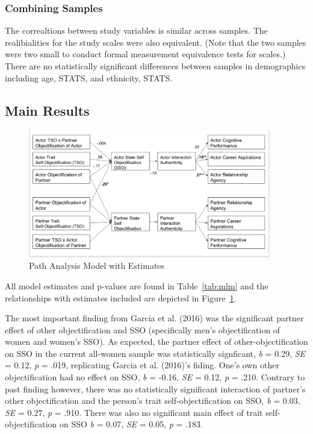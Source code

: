 \documentclass[man]{apa6}
\begin{document}
\subsubsection{Combining Samples}\label{combining-samples}

The correaltions between study variables is similar across samples. The
realibialities for the study scales were also equivalent. (Note that the
two samples were two small to conduct formal measurement equivalence
tests for scales.) There are no statistically significant differences
between samples in demographics including age, STATS, and ethnicity,
STATS.

\subsection{Main Results}\label{main-results}

\begin{figure}
\includegraphics[width=400px]{SEMfigure} \caption{Path Analysis Model with Estimates}\label{fig:semfigure}
\end{figure}

All model estimates and p-values are found in Table~\ref{tab:mlm} and
the relationships with estimates included are depicted in
Figure~\ref{fig:semfigure}.

The most important finding from Garcia et al. (2016) was the significant
partner effect of other objectification and SSO (specifically men's
objectification of women and women's SSO). As expected, the partner
effect of other-objectification on SSO in the current all-women sample
was statistically signficant, \emph{b} = 0.29, \emph{SE} = 0.12,
\emph{p} = .019, replicating Garcia et al. (2016)'s fiding. One's own
other objectification had no effect on SSO, \emph{b} = -0.16, \emph{SE}
= 0.12, \emph{p} = .210. Contrary to past finding however, there was no
statistically significant interaction of partner's other objectification
and the person's trait self-objectification on SSO, \emph{b} = 0.03,
\emph{SE} = 0.27, \emph{p} = .910. There was also no significant main
effect of trait self-objectification on SSO \emph{b} = 0.07, \emph{SE} =
0.05, \emph{p} = .183.
\end{document}
